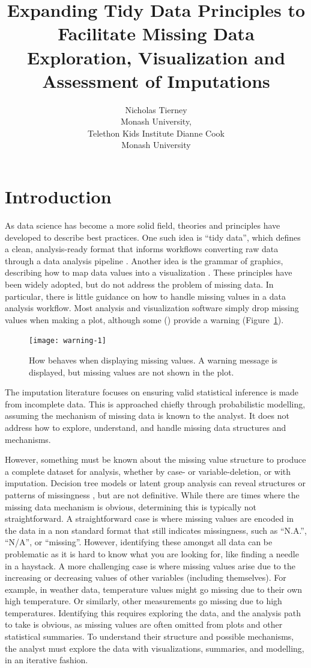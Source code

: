 \documentclass[article]{jss}
\author{
Nicholas Tierney\\Monash University, \\Telethon Kids Institute
\And Dianne Cook\\Monash University
}
\title{Expanding Tidy Data Principles to Facilitate Missing Data Exploration,
Visualization and Assessment of Imputations}
\begin{document}
\hypertarget{intro}{%
\section{Introduction}\label{intro}}

As data science has become a more solid field, theories and principles have
developed to describe best practices.  One such idea is ``tidy data'', which
defines a clean, analysis-ready format that informs workflows converting raw
data through a data analysis pipeline \citep{Wickham2014}.  Another idea is
the grammar of graphics, describing how to map data values into a
visualization \citep{Wilkinson2012}.  These principles have been widely
adopted, but do not address the problem of missing data.  In particular,
there is little guidance on how to handle missing values in a data analysis
workflow.  Most analysis and visualization software simply drop missing
values when making a plot, although some () provide a warning
(Figure~\ref{fig:warning}).

\begin{figure}[t!]
\centering
\texttt{[image: warning-1]}
\caption[How  behaves when displaying missing values]{How
 behaves when displaying missing values.  A warning message is
displayed, but missing values are not shown in the plot.}\label{fig:warning}
\end{figure}

The imputation literature focuses on ensuring valid statistical inference is
made from incomplete data.  This is approached chiefly through probabilistic
modelling, assuming the mechanism of missing data is known to the analyst.
It does not address how to explore, understand, and handle missing data
structures and mechanisms.

However, something must be known about the missing value structure to
produce a complete dataset for analysis, whether by case- or
variable-deletion, or with imputation.  Decision tree models or latent group
analysis can reveal structures or patterns of missingness
\citep{Tierney2015, Barnett2017}, but are not definitive.  While there are
times where the missing data mechanism is obvious, determining this is
typically not straightforward.  A straightforward case is where missing
values are encoded in the data in a non standard format that still indicates
missingness, such as ``N.A.'', ``N/A'', or ``missing''.  However,
identifying these amongst all data can be problematic as it is hard to know
what you are looking for, like finding a needle in a haystack.  A more
challenging case is where missing values arise due to the increasing or
decreasing values of other variables (including themselves).  For example,
in weather data, temperature values might go missing due to their own high
temperature.  Or similarly, other measurements go missing due to high
temperatures.  Identifying this requires exploring the data, and the
analysis path to take is obvious, as missing values are often omitted from
plots and other statistical summaries.  To understand their structure and
possible mechanisms, the analyst must explore the data with visualizations,
summaries, and modelling, in an iterative fashion.
\end{document}
